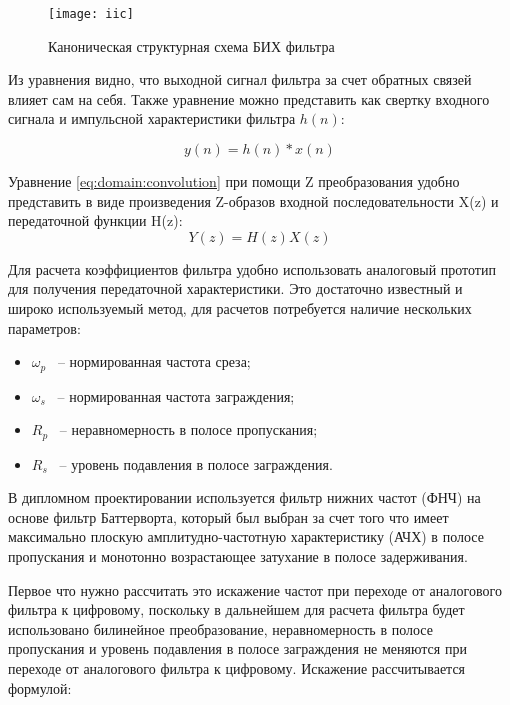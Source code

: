       \begin{figure}[ht]
        \centering
        \texttt{[image: iic]}
        \caption{Каноническая структурная схема БИХ фильтра}
        \label{pic:domain:iic}
    \end{figure}
    
Из уравнения видно, что выходной сигнал фильтра за счет обратных связей влияет сам на себя. 
Также уравнение можно представить как свертку входного сигнала и импульсной характеристики фильтра $h(n)$:

\begin{equation}
    \label{eq:domain:convolution}
    y(n) = h(n) \ast  x(n)
    \end{equation}

Уравнение \ref{eq:domain:convolution} при помощи Z преобразования удобно представить в виде произведения Z-образов входной последовательности X(z) и передаточной функции H(z):
\begin{equation}
    \label{eq:domain:Zconvolution}
    Y(z) = H(z)X(z)
    \end{equation}

Для расчета коэффициентов фильтра удобно использовать аналоговый прототип для получения передаточной характеристики. 
Это достаточно известный и широко используемый метод, для расчетов потребуется наличие нескольких параметров:

\begin{itemize}
    \item $\omega_{p}$ ~-- нормированная частота среза;
    \item $\omega_{s}$ ~-- нормированная частота заграждения;
    \item $R_{p}$ ~-- неравномерность в полосе пропускания;
    \item $R_{s}$ ~-- уровень подавления в полосе заграждения.
\end{itemize}

В дипломном проектировании используется фильтр нижних частот (ФНЧ) на основе фильтр Баттерворта, 
который был выбран за счет того что имеет максимально плоскую амплитудно-частотную характеристику
(АЧХ) в полосе пропускания и монотонно возрастающее затухание в полосе задерживания.

Первое что нужно рассчитать это искажение частот при переходе от аналогового фильтра к цифровому, поскольку в дальнейшем для
расчета фильтра будет использовано билинейное преобразование, 
неравномерность в полосе пропускания и уровень подавления в полосе 
заграждения не меняются при переходе от аналогового фильтра к цифровому. 
Искажение рассчитывается формулой:

